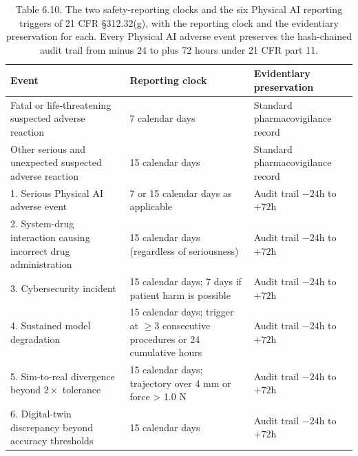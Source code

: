 \begin{table}[t]
\caption{Table 6.10. The two safety-reporting clocks and the six Physical AI
reporting triggers of 21 CFR \S 312.32(g), with the reporting clock and the
evidentiary preservation for each. Every Physical AI adverse event preserves the
hash-chained audit trail from minus 24 to plus 72 hours under 21 CFR part 11.}
\label{tab:sec06-triggers}
\centering
\begin{tabularx}{\textwidth}{L{4.6cm} L{5.6cm} Y}
\toprule
\textbf{Event} & \textbf{Reporting clock} & \textbf{Evidentiary preservation} \\
\midrule
Fatal or life-threatening suspected adverse reaction & 7 calendar days & Standard pharmacovigilance record \\
Other serious and unexpected suspected adverse reaction & 15 calendar days & Standard pharmacovigilance record \\
1. Serious Physical AI adverse event & 7 or 15 calendar days as applicable & Audit trail $-24$h to $+72$h \\
2. System-drug interaction causing incorrect drug administration & 15 calendar days (regardless of seriousness) & Audit trail $-24$h to $+72$h \\
3. Cybersecurity incident & 15 calendar days; 7 days if patient harm is possible & Audit trail $-24$h to $+72$h \\
4. Sustained model degradation & 15 calendar days; trigger at $\geq 3$ consecutive procedures or 24 cumulative hours & Audit trail $-24$h to $+72$h \\
5. Sim-to-real divergence beyond $2\times$ tolerance & 15 calendar days; trajectory over 4 mm or force > 1.0 N & Audit trail $-24$h to $+72$h \\
6. Digital-twin discrepancy beyond accuracy thresholds & 15 calendar days & Audit trail $-24$h to $+72$h \\
\bottomrule
\end{tabularx}
\end{table}

